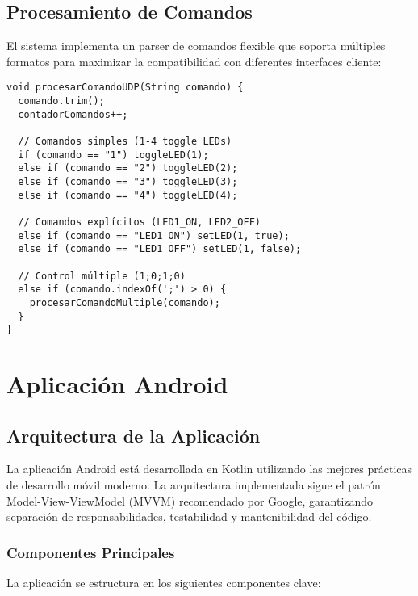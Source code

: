 \documentclass[conference,a4paper]{IEEEtran}
\begin{document}
\subsection{Procesamiento de Comandos}

El sistema implementa un parser de comandos flexible que soporta m\'ultiples formatos para maximizar la compatibilidad con diferentes interfaces cliente:

\begin{lstlisting}[style=arduino, caption=Parser de comandos UDP]
void procesarComandoUDP(String comando) {
  comando.trim();
  contadorComandos++;
  
  // Comandos simples (1-4 toggle LEDs)
  if (comando == "1") toggleLED(1);
  else if (comando == "2") toggleLED(2);
  else if (comando == "3") toggleLED(3);
  else if (comando == "4") toggleLED(4);
  
  // Comandos explícitos (LED1_ON, LED2_OFF)
  else if (comando == "LED1_ON") setLED(1, true);
  else if (comando == "LED1_OFF") setLED(1, false);
  
  // Control múltiple (1;0;1;0)
  else if (comando.indexOf(';') > 0) {
    procesarComandoMultiple(comando);
  }
}
\end{lstlisting}

\section{Aplicaci\'on Android}

\subsection{Arquitectura de la Aplicaci\'on}

La aplicaci\'on Android est\'a desarrollada en Kotlin utilizando las mejores pr\'acticas de desarrollo m\'ovil moderno. La arquitectura implementada sigue el patr\'on Model-View-ViewModel (MVVM) recomendado por Google, garantizando separaci\'on de responsabilidades, testabilidad y mantenibilidad del c\'odigo.

\subsubsection{Componentes Principales}

La aplicaci\'on se estructura en los siguientes componentes clave:
\end{document}

